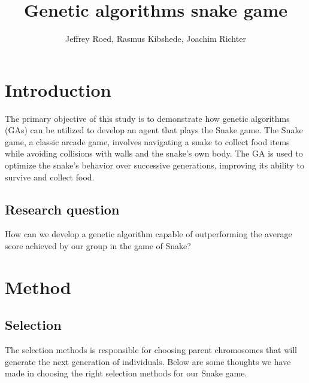 \documentclass[a4paper, twocolumn]{article}
\author{Jeffrey Roed, Rasmus Kibshede, Joachim Richter}
\title{Genetic algorithms snake game}
\begin{document}

\section {Introduction\label{sec:Introduction}}
 
The primary objective of this study is to demonstrate how genetic algorithms (GAs) can be utilized to develop an agent that plays the Snake game. The Snake game, a classic arcade game, involves navigating a snake to collect food items while avoiding collisions with walls and the snake's own body. The GA is used to optimize the snake's behavior over successive generations, improving its ability to survive and collect food.
\subsection{Research question\label{sec:Research Question}}
How can we develop a genetic algorithm capable of outperforming the average score achieved by our group in the game of Snake?

\section{Method\label{sec:Method}}
\subsection{Selection\label{sec:Selection}}

The selection methods is responsible for choosing parent chromosomes that will generate the next generation of individuals. Below are some thoughts we have made in choosing the right selection methods for our Snake game.
\end{document}
